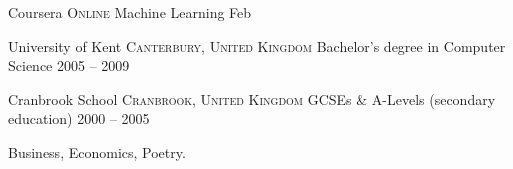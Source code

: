 \documentclass[10pt,a4paper]{article}
\begin{document}

\headedsection
  {Coursera}
  {\textsc{Online}} {%
  \headedsubsection
    {Machine Learning}
    {Feb }
    {
  }
}

\headedsection
  {University of Kent}
  {\textsc{Canterbury, United Kingdom}} {%
  \headedsubsection
    {Bachelor's degree in Computer Science}
    {2005 -- 2009}
    {\bodytext{}
  }
}

\headedsection
  {Cranbrook School}
  {\textsc{Cranbrook, United Kingdom}} {%
  \headedsubsection
    {GCSEs \& A-Levels \textnormal{(secondary education)}}
    {2000 -- 2005}
    {\bodytext{}
  }
}

\spacedhrule{0em}{-0.4em}


\inlineheadsection
  {}
  {Business, Economics, Poetry.}
\end{document}
